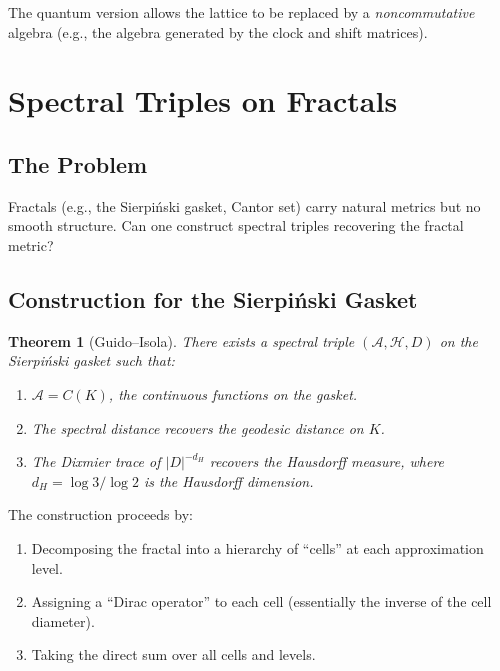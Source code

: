 \documentclass[11pt,a4paper]{article}
\newtheorem{theorem}{Theorem}[section]
\begin{document}
The quantum version allows the lattice to be replaced by a
\emph{noncommutative} algebra (e.g., the algebra generated by the
clock and shift matrices).

\section{Spectral Triples on Fractals}

\subsection{The Problem}

Fractals (e.g., the Sierpi\'nski gasket, Cantor set) carry natural metrics
but no smooth structure. Can one construct spectral triples recovering the
fractal metric?

\subsection{Construction for the Sierpi\'nski Gasket}

\begin{theorem}[Guido--Isola]
There exists a spectral triple $(\mathcal{A}, \mathcal{H}, D)$ on the
Sierpi\'nski gasket such that:
\begin{enumerate}[nosep]
  \item $\mathcal{A} = C(K)$, the continuous functions on the gasket.
  \item The spectral distance recovers the geodesic distance on $K$.
  \item The Dixmier trace of $|D|^{-d_H}$ recovers the Hausdorff measure,
        where $d_H = \log 3/\log 2$ is the Hausdorff dimension.
\end{enumerate}
\end{theorem}

The construction proceeds by:
\begin{enumerate}[nosep]
  \item Decomposing the fractal into a hierarchy of ``cells'' at each
        approximation level.
  \item Assigning a ``Dirac operator'' to each cell (essentially the
        inverse of the cell diameter).
  \item Taking the direct sum over all cells and levels.
\end{enumerate}
\end{document}
